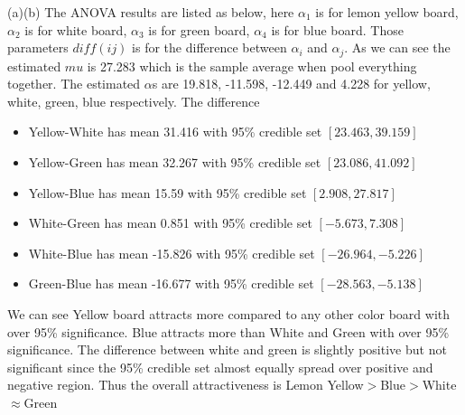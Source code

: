 \documentclass{homeworg}
\begin{document}
(a)(b) The ANOVA results are listed as below, here $\alpha_1$ is for lemon yellow board, $\alpha_2$ is for white board, $\alpha_3$ is for green board, $\alpha_4$ is for blue board. Those parameters $diff(ij)$ is for the difference between $\alpha_i$ and $\alpha_j$. As we can see the estimated $mu$ is 27.283 which is the sample average when pool everything together. The estimated $\alpha$s are 19.818, -11.598, -12.449 and 4.228 for yellow, white, green, blue respectively. The difference
\begin{itemize}
\item Yellow-White has mean 31.416 with 95\% credible set $[23.463,39.159]$
\item Yellow-Green has mean 32.267 with 95\% credible set $[23.086,41.092]$
\item Yellow-Blue has mean 15.59 with 95\% credible set $[2.908,27.817]$
\item White-Green has mean 0.851 with 95\% credible set $[-5.673,7.308]$ 
\item White-Blue has mean -15.826 with 95\% credible set $[-26.964,-5.226]$
\item Green-Blue has mean -16.677 with 95\% credible set $[-28.563,-5.138]$
\end{itemize}
We can see Yellow board attracts more compared to any other color board with over 95\% significance. Blue attracts more than White and Green with over 95\% significance. The difference between white and green is slightly positive but not significant since the 95\% credible set almost equally spread over positive and negative region. Thus the overall attractiveness is Lemon Yellow$>$Blue$>$White$\approx$Green
\end{document}
